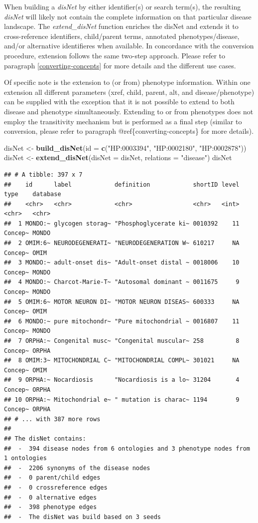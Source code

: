 \documentclass[9pt,a4paper,]{extarticle}
\newenvironment{Shaded}{\begin{snugshade}}{\end{snugshade}}
\newcommand{\DataTypeTok}[1]{\textcolor[rgb]{0.13,0.29,0.53}{#1}}
\newcommand{\KeywordTok}[1]{\textcolor[rgb]{0.13,0.29,0.53}{\textbf{#1}}}
\newcommand{\NormalTok}[1]{#1}
\newcommand{\StringTok}[1]{\textcolor[rgb]{0.31,0.60,0.02}{#1}}
\begin{document}
When building a \emph{disNet} by either identifier(s) or search term(s), the resulting \emph{disNet} will likely not contain the complete information on that particular disease landscape. The \emph{extend\_disNet} function enriches the disNet and extends it to cross-reference identifiers, child/parent terms, annotated phenotypes/disease, and/or alternative identifieres when available. In concordance with the conversion procedure, extension follows the same two-step approach. Please refer to paragraph \ref{converting-concepts} for more details and the different use cases.

Of specific note is the extension to (or from) phenotype information. Within one extension all different parameters (xref, child, parent, alt, and disease/phenotype) can be supplied with the exception that it is not possible to extend to both disease and phenotype simultaneously. Extending to or from phenotypes does not employ the transitivity mechanism but is performed as a final step (similar to conversion, please refer to paragraph @ref\{converting-concepts\} for more details).

\begin{Shaded}
\begin{Highlighting}[]
\NormalTok{disNet <-}\StringTok{ }\KeywordTok{build_disNet}\NormalTok{(}\DataTypeTok{id =} \KeywordTok{c}\NormalTok{(}\StringTok{"HP:0003394"}\NormalTok{, }\StringTok{"HP:0002180"}\NormalTok{, }\StringTok{"HP:0002878"}\NormalTok{))}
\NormalTok{disNet <-}\StringTok{ }\KeywordTok{extend_disNet}\NormalTok{(}\DataTypeTok{disNet =}\NormalTok{ disNet, }\DataTypeTok{relations =} \StringTok{"disease"}\NormalTok{)}
\NormalTok{disNet}
\end{Highlighting}
\end{Shaded}

\begin{verbatim}
## # A tibble: 397 x 7
##    id      label            definition            shortID level type    database
##    <chr>   <chr>            <chr>                 <chr>   <int> <chr>   <chr>   
##  1 MONDO:~ glycogen storag~ "Phosphoglycerate ki~ 0010392    11 Concep~ MONDO   
##  2 OMIM:6~ NEURODEGENERATI~ "NEURODEGENERATION W~ 610217     NA Concep~ OMIM    
##  3 MONDO:~ adult-onset dis~ "Adult-onset distal ~ 0018006    10 Concep~ MONDO   
##  4 MONDO:~ Charcot-Marie-T~ "Autosomal dominant ~ 0011675     9 Concep~ MONDO   
##  5 OMIM:6~ MOTOR NEURON DI~ "MOTOR NEURON DISEAS~ 600333     NA Concep~ OMIM    
##  6 MONDO:~ pure mitochondr~ "Pure mitochondrial ~ 0016807    11 Concep~ MONDO   
##  7 ORPHA:~ Congenital musc~ "Congenital muscular~ 258         8 Concep~ ORPHA   
##  8 OMIM:3~ MITOCHONDRIAL C~ "MITOCHONDRIAL COMPL~ 301021     NA Concep~ OMIM    
##  9 ORPHA:~ Nocardiosis      "Nocardiosis is a lo~ 31204       4 Concep~ ORPHA   
## 10 ORPHA:~ Mitochondrial e~ " mutation is charac~ 1194        9 Concep~ ORPHA   
## # ... with 387 more rows
## 
## The disNet contains:
##  -  394 disease nodes from 6 ontologies and 3 phenotype nodes from 1 ontologies 
##  -  2206 synonyms of the disease nodes
##  -  0 parent/child edges
##  -  0 crossreference edges
##  -  0 alternative edges
##  -  398 phenotype edges
##  -  The disNet was build based on 3 seeds
\end{verbatim}
\end{document}
